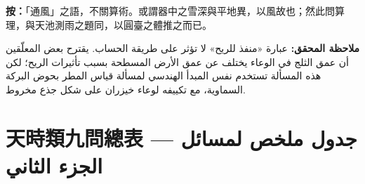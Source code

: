 \documentclass[11pt,a4paper]{article}
\newcommand{\ar}[1]{\arabicfont\beginR #1\endR}
\newcommand{\editornote}[2]{\par\noindent%
  \begin{minipage}[t]{0.48\textwidth}\textbf{按：}#1\end{minipage}%
  \hfill%
  \begin{minipage}[t]{0.48\textwidth}\arabicfont\beginR\textbf{ملاحظة المحقق:} #2\endR\end{minipage}\par\vspace{0.2cm}}
\begin{document}
\editornote{「通風」之語，不關算術。或謂器中之雪深與平地異，以風故也；然此問算理，與天池測雨之題同，以圓臺之體推之而已。}{عبارة «منفذ للريح» لا تؤثر على طريقة الحساب. يقترح بعض المعلّقين أن عمق الثلج في الوعاء يختلف عن عمق الأرض المسطحة بسبب تأثيرات الريح؛ لكن هذه المسألة تستخدم نفس المبدأ الهندسي لمسألة قياس المطر بحوض البركة السماوية، مع تكييفه لوعاء خيزران على شكل جذع مخروط.}

\newpage

\section*{天時類九問總表 — \ar{جدول ملخص لمسائل الجزء الثاني}}
\end{document}
